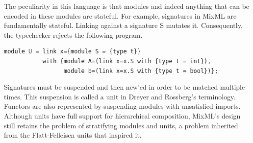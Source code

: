 \documentclass[12pt]{article}
\begin{document}
The peculiarity in this language is that modules and indeed anything that can be encoded in these modules are stateful. For example, signatures in MixML are fundamentally stateful. Linking against a signature S mutates it. Consequently, the typechecker rejects the following program. 
\begin{lstlisting}
module U = link x={module S = {type t}} 
           with {module A=(link x=x.S with {type t = int}), 
                 module b=(link x=x.S with {type t = bool})};		
\end{lstlisting}
Signatures must be suspended and then new'ed in order to be matched multiple times. This suspension is called a unit in Dreyer and Rossberg's terminology. Functors are also represented by suspending modules with unsatisfied imports. Although units have full support for hierarchical composition, MixML's design still retains the problem of stratifying modules and units, a problem inherited from the Flatt-Felleisen units that inspired it. 


\end{document}
